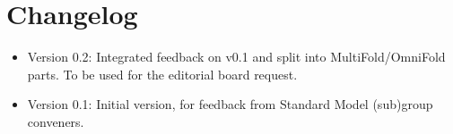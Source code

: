 \section{Changelog}

\begin{itemize}
\item Version 0.2: Integrated feedback on v0.1 and split into MultiFold/OmniFold parts.  To be used for the editorial board request.
\item Version 0.1: Initial version, for feedback from Standard Model (sub)group conveners.
\end{itemize}